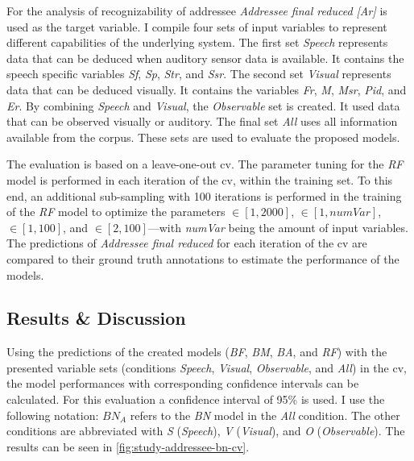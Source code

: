 For the analysis of recognizability of \gls{addressee} \emph{Addressee final reduced [Ar]} is used as the target variable.
I compile four sets of input variables to represent different capabilities of the underlying system.
The first set \emph{Speech} represents data that can be deduced when auditory sensor data is available.
It contains the speech specific variables \emph{Sf}, \emph{Sp}, \emph{Str}, and \emph{Ssr}.
The second set \emph{Visual} represents data that can be deduced visually.
It contains the variables \emph{Fr}, \emph{M}, \emph{Msr}, \emph{Pid}, and \emph{Er}.
By combining \emph{Speech} and \emph{Visual}, the \emph{Observable} set is created.
It used data that can be observed visually or auditory.
The final set \emph{All} uses all information available from the corpus.
These sets are used to evaluate the proposed models.

The evaluation is based on a leave-one-out \gls{cv}.
The parameter tuning for the \emph{RF} model is performed in each iteration of the \gls{cv}, within the training set.
To this end, an additional sub-sampling with 100 iterations is performed in the training of the \emph{RF} model to optimize the parameters  \(\in [1,2000]\),  \(\in [1,numVar]\),  \(\in [1,100]\), and  \(\in [2,100]\)---with \emph{numVar} being the amount of input variables.
The predictions of \emph{Addressee final reduced} for each iteration of the \gls{cv} are compared to their ground truth annotations to estimate the performance of the models.

\subsection{Results \& Discussion}

Using the predictions of the created models (\emph{BF}, \emph{BM}, \emph{BA}, and \emph{RF}) with the presented variable sets (conditions \emph{Speech}, \emph{Visual}, \emph{Observable}, and \emph{All}) in the \gls{cv}, the model performances with corresponding confidence intervals can be calculated.
For this evaluation a confidence interval of 95\% is used.
I use the following notation: \(BN_A\) refers to the \emph{BN} model in the \emph{All} condition.
The other conditions are abbreviated with \emph{S} (\emph{Speech}), \emph{V} (\emph{Visual}), and \emph{O} (\emph{Observable}).
The results can be seen in \cref{fig:study-addressee-bn-cv}.

